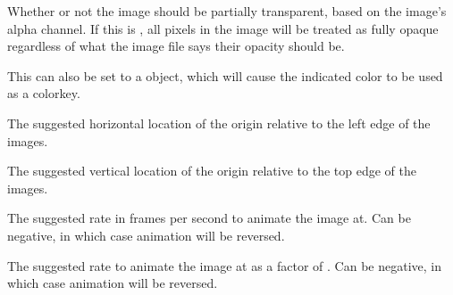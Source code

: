 \documentclass[letterpaper,10pt,english]{sphinxmanual}
\begin{document}
\begin{fulllineitems}
\begin{fulllineitems}
\end{fulllineitems}


\begin{fulllineitems}
\label{gfx:sge.gfx.Sprite.transparent}
Whether or not the image should be partially transparent, based
on the image's alpha channel.  If this is , all
pixels in the image will be treated as fully opaque regardless
of what the image file says their opacity should be.

This can also be set to a {\hyperref[gfx:sge.gfx.Color]{\emph{}}} object, which
will cause the indicated color to be used as a colorkey.

\end{fulllineitems}


\begin{fulllineitems}
\label{gfx:sge.gfx.Sprite.origin_x}
The suggested horizontal location of the origin relative to the
left edge of the images.

\end{fulllineitems}


\begin{fulllineitems}
\label{gfx:sge.gfx.Sprite.origin_y}
The suggested vertical location of the origin relative to the top
edge of the images.

\end{fulllineitems}


\begin{fulllineitems}
\label{gfx:sge.gfx.Sprite.fps}
The suggested rate in frames per second to animate the image at.
Can be negative, in which case animation will be reversed.

\end{fulllineitems}


\begin{fulllineitems}
\label{gfx:sge.gfx.Sprite.speed}
The suggested rate to animate the image at as a factor of
.  Can be negative, in which case animation
will be reversed.


\end{fulllineitems}
\end{fulllineitems}
\end{document}
